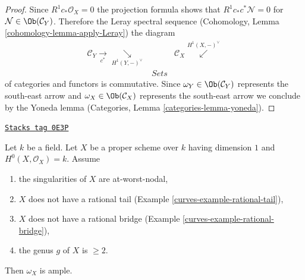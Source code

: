 \begin{proof}
\medskip\noindent
Since $R^1c_*\mathcal{O}_X = 0$ the projection formula shows that
$R^1c_*c^*\mathcal{N} = 0$ for $\mathcal{N} \in \Ob(\mathcal{C}_Y)$.
Therefore the Leray spectral sequence
(Cohomology, Lemma \ref{cohomology-lemma-apply-Leray})
the diagram
$$
\begin{array}{ccc}\mathcal{C}_Y \underset{c^*}{\longrightarrow}\underset{H^1(Y, -)^\vee}{\searrow} &  & \mathcal{C}_X \overset{H^1(X, -)^\vee}{\swarrow} \\  & \textit{Sets} & \end{array}
$$
of categories and functors is commutative. Since
$\omega_Y \in \Ob(\mathcal{C}_Y)$ represents the south-east arrow and
$\omega_X \in \Ob(\mathcal{C}_X)$ represents the south-east arrow
we conclude by the Yoneda lemma
(Categories, Lemma \ref{categories-lemma-yoneda}).
\end{proof}

\begin{lemma}
\label{curves-lemma-no-rational-bridge-ample-genus-geq-2}
\href{https://stacks.math.columbia.edu/tag/0E3P}{\texttt{Stacks tag 0E3P}}

Let $k$ be a field. Let $X$ be a proper scheme over $k$ having dimension $1$
and $H^0(X, \mathcal{O}_X) = k$. Assume
\begin{enumerate}
\item the singularities of $X$ are at-worst-nodal,
\item $X$ does not have a rational tail
(Example \ref{curves-example-rational-tail}),
\item $X$ does not have a rational bridge
(Example \ref{curves-example-rational-bridge}),
\item the genus $g$ of $X$ is $\geq 2$.
\end{enumerate}
Then $\omega_X$ is ample.
\end{lemma}

